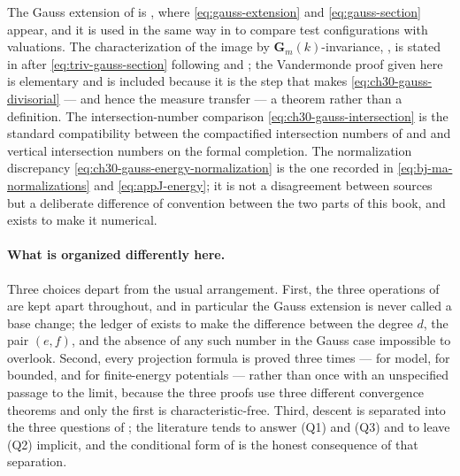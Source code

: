 The Gauss extension of  is
\cite[\S1]{BJ22}, where \eqref{eq:gauss-extension} and
\eqref{eq:gauss-section} appear, and it is used in the same way in
\cite{BHJ17} to compare test configurations with valuations.  The
characterization of the image by \(\mathbf G_m(k)\)-invariance,
, is stated in
 after
\eqref{eq:triv-gauss-section} following \cite[\S1]{BJ22} and
\cite[\S2]{BHJ17}; the Vandermonde proof given here is elementary and is
included because it is the step that makes
\eqref{eq:ch30-gauss-divisorial} --- and hence the measure transfer --- a
theorem rather than a definition.  The intersection-number comparison
\eqref{eq:ch30-gauss-intersection} is the standard compatibility between
the compactified intersection numbers of \cite[\S3]{BHJ17} and
\cite[\S7]{BJ22} and vertical intersection numbers on the formal
completion.  The normalization discrepancy
\eqref{eq:ch30-gauss-energy-normalization} is the one recorded in
\eqref{eq:bj-ma-normalizations} and \eqref{eq:appJ-energy}; it is not a
disagreement between sources but a deliberate difference of convention
between the two parts of this book, and
 exists to make it numerical.

\paragraph{What is organized differently here.}
Three choices depart from the usual arrangement.  First, the three
operations of  are kept apart throughout, and in
particular the Gauss extension is never called a base change; the ledger of
 exists to make the difference between the
degree \(d\), the pair \((e,f)\), and the absence of any such number in the
Gauss case impossible to overlook.  Second, every projection formula is
proved three times --- for model, for bounded, and for finite-energy
potentials --- rather than once with an unspecified passage to the limit,
because the three proofs use three different convergence theorems and only
the first is characteristic-free.  Third, descent is separated into the
three questions of ; the literature tends
to answer (Q1) and (Q3) and to leave (Q2) implicit, and the conditional form
of  is the honest consequence of that
separation.

